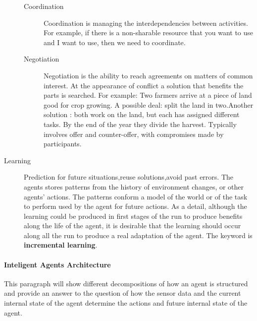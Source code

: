 \documentclass{report}
\begin{document}
\begin{description}
\begin{description}
		\item [Coordination] Coordination is managing the interdependencies between activities.
		For example, if there is a non-sharable resource that you want to use and I want to use, 
		then we need to coordinate.

		\item [Negotiation] Negotiation is the ability to reach agreements on matters of common 
		interest. At the appearance of conflict a solution that benefits the parts is searched.
		For example: Two farmers arrive at a piece of land good for crop growing. A possible deal: split
		the land in two.Another solution : both work on the land, but each has assigned different
		tasks. By the end of the year they divide the harvest. Typically involves offer and 
		counter-offer, with compromises made by participants.

	\end{description}

	\item [Learning] Prediction for future situations,reuse solutions,avoid past errors. The agents stores
	patterns from the history of environment changes, or other agents' actions. The patterns conform a model
	of the world or of the task to perform used by the agent for future actions. As a detail, although the 
	learning could be produced in first stages of the run to produce benefits along the life of the agent,
	it is desirable that the learning should occur along all the run to produce a real adaptation of the 
	agent. The keyword is \textbf{incremental learning}.
\end{description}


\paragraph{Inteligent Agents Architecture}

This paragraph will show different decompositions of how an agent is structured 
and provide an answer to the question of how the sensor data and the current internal 
state of the agent determine the actions and future internal state of the agent.
\end{document}

